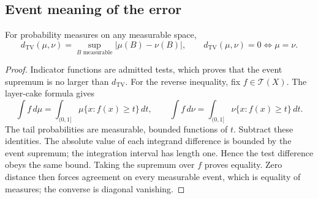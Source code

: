 \subsection{Event meaning of the error}

\begin{theorem}
\label{thm:variation-events}
For probability measures on any measurable space,
\[
 d_{\mathrm{TV}}(\mu,\nu)
   =\sup_{B\text{ measurable}}|\mu(B)-\nu(B)|,
 \qquad d_{\mathrm{TV}}(\mu,\nu)=0\iff\mu=\nu.
\]
\end{theorem}
\begin{proof}
Indicator functions are admitted tests, which proves that the event
supremum is no larger than $d_{\mathrm{TV}}$.
For the reverse inequality, fix $f\in\mathcal T(X)$. The layer-cake
formula gives
\[
 \int f\,d\mu=\int_{(0,1]}\mu\{x:f(x)\ge t\}\,dt,
 \qquad
 \int f\,d\nu=\int_{(0,1]}\nu\{x:f(x)\ge t\}\,dt.
\]
The tail probabilities are measurable, bounded functions of $t$.
Subtract these identities. The absolute value of each integrand
difference is bounded by the event supremum; the integration interval
has length one. Hence the test difference obeys the same bound.
Taking the supremum over $f$ proves equality. Zero distance then forces
agreement on every measurable event, which is equality of measures;
the converse is diagonal vanishing.
\end{proof}

